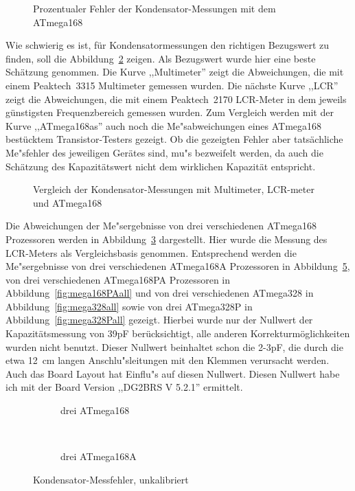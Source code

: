 \begin{figure}[H]
\centering

\caption{Prozentualer Fehler der Kondensator-Messungen mit dem ATmega168}
\label{fig:mega168cap}
\end{figure}

Wie schwierig es ist, f\"ur Kondensatormessungen den richtigen Bezugswert zu finden, soll die Abbildung~\ref{fig:capcompare} zeigen.
Als Bezugswert wurde hier eine beste Sch\"atzung genommen. Die Kurve ,,Multimeter'' zeigt die Abweichungen, die mit einem
Peaktech~3315 Multimeter gemessen wurden.
Die n\"achste Kurve ,,LCR'' zeigt die Abweichungen, die mit einem Peaktech~2170 LCR-Meter in dem jeweils g\"unstigsten Frequenzbereich gemessen wurden.
Zum Vergleich werden mit der Kurve ,,ATmega168as'' auch noch die Me"sabweichungen eines ATmega168 best\"ucktem Transistor-Testers gezeigt.
Ob die gezeigten Fehler aber tats\"achliche Me"sfehler des jeweiligen Ger\"ates sind, mu"s bezweifelt werden, da auch die
Sch\"atzung des Kapazit\"atswert nicht dem wirklichen Kapazit\"at entspricht.

\begin{figure}[H]
\centering

\caption{Vergleich der Kondensator-Messungen mit Multimeter, LCR-meter und ATmega168}
\label{fig:capcompare}
\end{figure}

Die Abweichungen der Me"sergebnisse von drei verschiedenen ATmega168 Prozessoren werden in Abbildung~\ref{fig:mega168all} dargestellt.
Hier wurde die Messung des LCR-Meters als Vergleichsbasis genommen.
Entsprechend werden die Me"sergebnisse von drei verschiedenen ATmega168A Prozessoren in Abbildung~\ref{fig:mega168Aall}, 
von drei verschiedenen ATmega168PA Prozessoren in Abbildung~\ref{fig:mega168PAall} und von drei verschiedenen
ATmega328 in Abbildung~\ref{fig:mega328all} sowie von drei ATmega328P in Abbildung~\ref{fig:mega328Pall} gezeigt.
Hierbei wurde nur der Nullwert der Kapazit\"atsmessung von 39pF ber\"ucksichtigt, alle anderen Korrekturm\"oglichkeiten wurden
nicht benutzt. Dieser Nullwert beinhaltet schon die 2-3pF, die durch die etwa 12~cm langen Anschlu"sleitungen mit den
Klemmen verursacht werden.
Auch das Board Layout hat Einflu"s auf diesen Nullwert. Diesen Nullwert habe ich mit der Board Version ,,DG2BRS V 5.2.1'' ermittelt.

\begin{figure}[H]
  \begin{subfigure}[b]{9cm}
    \centering
    \resizebox{9cm}{!}{}
    \caption{drei ATmega168}
    \label{fig:mega168all}
  \end{subfigure}
  ~
  \begin{subfigure}[b]{9cm}
    \centering
    \resizebox{9cm}{!}{}
    \caption{drei ATmega168A}
    \label{fig:mega168Aall}
  \end{subfigure}
  \caption{Kondensator-Messfehler, unkalibriert}
\end{figure}

